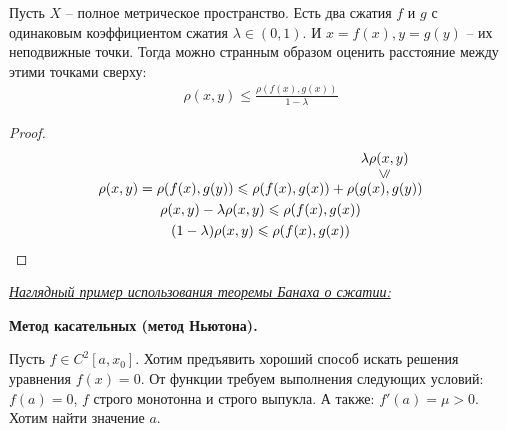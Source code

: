 Пусть $X$ -- полное метрическое пространство. Есть два сжатия $f$ и $g$ с одинаковым коэффициентом сжатия $\lambda \in (0, 1)$.
И $x = f(x), y = g(y)$ -- их неподвижные точки. Тогда можно странным образом оценить расстояние между этими точками сверху: 
\begin{gather*}
    \rho(x, y) \leqslant \frac{\rho(f(x), g(x))}{1 - \lambda}
\end{gather*}
\begin{proof}
    \begin{gather*}
        \rho(x, y) = \rho(f(x), g(y)) \leqslant \rho(f(x), g(x)) + \lessabove{\rho(g(x), g(y))}{\lambda \rho(x, y)} \\
        \rho(x, y) - \lambda \rho(x, y) \leqslant \rho(f(x), g(x)) \\
        (1 - \lambda) \rho(x, y) \leqslant \rho(f(x), g(x))
    \end{gather*}
\end{proof}
\underline{\textit{Наглядный пример использования теоремы Банаха о сжатии:}}

\textbf{Метод касательных (метод Ньютона).}

Пусть $f \in C^2[a, x_0]$. Хотим предъявить хороший способ искать решения уравнения $f(x) = 0$.
От функции требуем выполнения следующих условий: $f(a) = 0$, $f$ строго монотонна и строго выпукла. А также: $f'(a) = \mu > 0$.
Хотим найти значение $a$.

